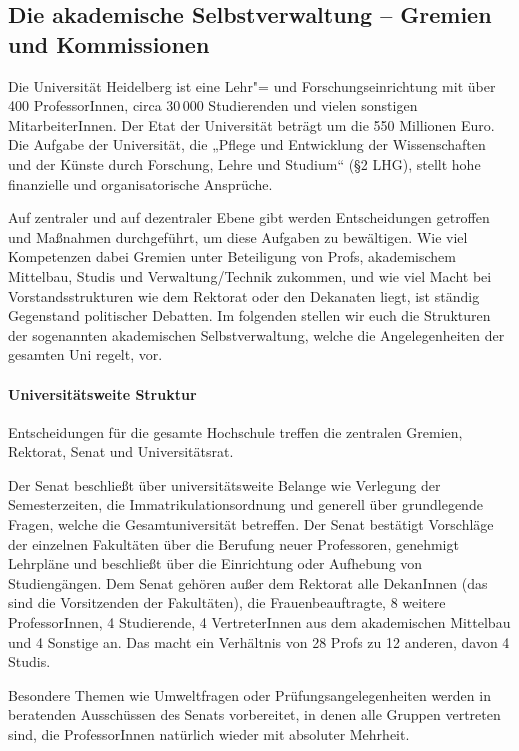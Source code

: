 \subsection{Die akademische Selbstverwaltung -- Gremien und Kommissionen}

Die Universität Heidelberg ist eine Lehr"= und Forschungseinrichtung mit über 400 ProfessorInnen, circa 30\,000 Studierenden und vielen sonstigen
MitarbeiterInnen. Der Etat der Universität beträgt um die 550 Millionen Euro. Die Aufgabe der Universität, die „Pflege und Entwicklung der
Wissenschaften und der Künste durch Forschung, Lehre und Studium“ (§2 %
LHG), stellt hohe finanzielle und organisatorische Ansprüche.

Auf zentraler und auf dezentraler Ebene gibt werden Entscheidungen getroffen und Maßnahmen durchgeführt, um diese Aufgaben zu bewältigen. Wie viel Kompetenzen dabei Gremien unter Beteiligung  von Profs, akademischem Mittelbau, Studis und Verwaltung/Technik zukommen, und wie viel Macht bei Vorstandsstrukturen wie dem Rektorat oder den Dekanaten liegt, ist ständig Gegenstand politischer Debatten. Im folgenden stellen wir euch die Strukturen der sogenannten akademischen Selbstverwaltung, welche die Angelegenheiten der gesamten Uni regelt, vor.

\paragraph{Universitätsweite Struktur}

Entscheidungen für die gesamte Hochschule treffen die zentralen Gremien, Rektorat, Senat und Universitätsrat.

Der Senat beschließt über
universitätsweite Belange wie Verlegung der Semesterzeiten, die
Immatrikulationsordnung und generell über grundlegende Fragen, welche die
Gesamtuniversität betreffen. Der Senat bestätigt Vorschläge der einzelnen
Fakultäten über die Berufung neuer Professoren, genehmigt Lehrpläne und
beschließt über die Einrichtung oder Aufhebung von Studiengängen. Dem
Senat gehören außer dem Rektorat alle DekanInnen (das sind die
Vorsitzenden der Fakultäten), die Frauenbeauftragte, 8 weitere ProfessorInnen, 4 Studierende, 4 VertreterInnen aus dem akademischen Mittelbau und 4 Sonstige an. Das macht ein Verhältnis von 28 Profs zu 12 anderen, davon 4 Studis.

Besondere Themen wie Umweltfragen oder
Prüfungsangelegenheiten werden in beratenden Ausschüssen des Senats
vorbereitet, in denen alle Gruppen vertreten sind, die ProfessorInnen
natürlich wieder mit absoluter Mehrheit.

